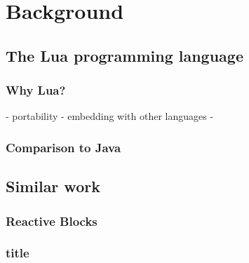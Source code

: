 \chapter{Background}
\label{chp:background}

\section{The Lua programming language}
\label{sec:lua}

\subsection{Why Lua?}
- portability
- embedding with other languages
- 

\subsection{Comparison to Java}

\section{Similar work}

\subsection{Reactive Blocks}

\subsection{title}